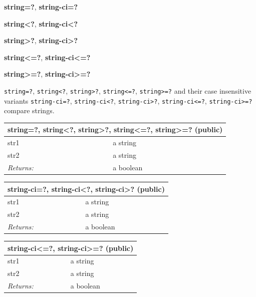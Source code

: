 \documentclass[twoside,9pt]{report}
\begin{document}
\textbf{string=?}, \textbf{string-ci=?}


\textbf{string<?}, \textbf{string-ci<?}


\textbf{string>?}, \textbf{string-ci>?}


\textbf{string<=?}, \textbf{string-ci<=?}


\textbf{string>=?}, \textbf{string-ci>=?}


\texttt{string=?}, \texttt{string<?}, \texttt{string>?}, \texttt{string<=?}, \texttt{string>=?} and their case insensitive variants \texttt{string-ci=?}, \texttt{string-ci<?}, \texttt{string-ci>?}, \texttt{string-ci<=?}, \texttt{string-ci>=?} compare strings.

\begin{tabular}{ |l l| }
\hline
\multicolumn{2}{|l|}{string=?, string<?, string>?, string<=?, string>=? (public)} \\
\hline
str1 & a string \\
str2 & a string \\
\textit{Returns:} & a boolean \\
\hline
\end{tabular}

\begin{tabular}{ |l l| }
\hline
\multicolumn{2}{|l|}{string-ci=?, string-ci<?, string-ci>? (public)} \\
\hline
str1 & a string \\
str2 & a string \\
\textit{Returns:} & a boolean \\
\hline
\end{tabular}

\begin{tabular}{ |l l| }
\hline
\multicolumn{2}{|l|}{string-ci<=?, string-ci>=? (public)} \\
\hline
str1 & a string \\
str2 & a string \\
\textit{Returns:} & a boolean \\
\hline
\end{tabular}
\end{document}
